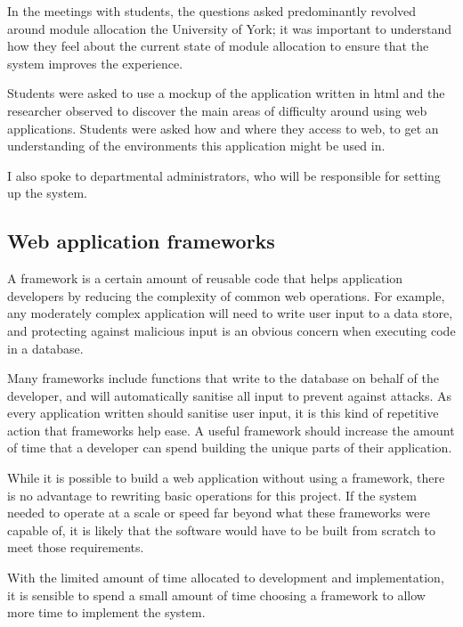 \documentclass[]{scrartcl}
\begin{document}
In the meetings with students, the questions asked predominantly revolved
around module allocation the University of York; it was important to
understand how they feel about the current state of module allocation to
ensure that the system improves the experience.

Students were asked to use a mockup of the application written in \gls{html}
and the researcher observed to discover the main areas of difficulty around
using web applications. Students were asked how and where they access to web,
to get an understanding of the environments this application might be used in.


I also spoke to departmental administrators, who will be responsible for setting up
the system.


\subsection{Web application frameworks}
\label{webframeworks}


A framework is a certain amount of reusable code that helps application
developers by reducing the complexity of common web operations. For example,
any moderately complex application will need to write user input to a data
store, and protecting against malicious input is an obvious concern when
executing code in a database.

Many frameworks include functions that write to the database on behalf of the
developer, and will automatically sanitise all input to prevent against
attacks. As every application written should sanitise user input, it is this
kind of repetitive action that frameworks help ease. A useful framework should
increase the amount of time that a developer can spend building the unique
parts of their application.

While it is possible to build a web application without using a framework,
there is no advantage to rewriting basic operations for this project. If the
system needed to operate at a scale or speed far beyond what these frameworks
were capable of, it is likely that the software would have to be built from
scratch to meet those requirements.

With the limited amount of time allocated to development and implementation,
it is sensible to spend a small amount of time choosing a framework to allow
more time to implement the system.
\end{document}
